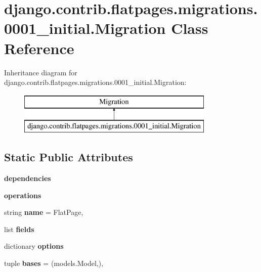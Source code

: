 \hypertarget{classdjango_1_1contrib_1_1flatpages_1_1migrations_1_10001__initial_1_1_migration}{}\section{django.\+contrib.\+flatpages.\+migrations.0001\+\_\+initial.Migration Class Reference}
\label{classdjango_1_1contrib_1_1flatpages_1_1migrations_1_10001__initial_1_1_migration}
Inheritance diagram for django.\+contrib.\+flatpages.\+migrations.0001\+\_\+initial.Migration\+:\begin{figure}[H]
\begin{center}
\leavevmode
\includegraphics[height=2.000000cm]{classdjango_1_1contrib_1_1flatpages_1_1migrations_1_10001__initial_1_1_migration}
\end{center}
\end{figure}
\subsection*{Static Public Attributes}
\begin{DoxyCompactItemize}
\item 
\mbox{\label{classdjango_1_1contrib_1_1flatpages_1_1migrations_1_10001__initial_1_1_migration_aefd2787afda3aef95aba0bf9f108cc40}} 
{\bfseries dependencies}
\item 
\mbox{\label{classdjango_1_1contrib_1_1flatpages_1_1migrations_1_10001__initial_1_1_migration_a026d8fc271aaca41a32626bf34debff9}} 
{\bfseries operations}
\item 
\mbox{\label{classdjango_1_1contrib_1_1flatpages_1_1migrations_1_10001__initial_1_1_migration_a3927685bc2502d7b41d73e1f18b7f3ba}} 
string {\bfseries name} = \textquotesingle{}Flat\+Page\textquotesingle{},
\item 
list {\bfseries fields}
\item 
dictionary {\bfseries options}
\item 
\mbox{\label{classdjango_1_1contrib_1_1flatpages_1_1migrations_1_10001__initial_1_1_migration_a0879adea70f8e803f0efa6d7c23bc8fa}} 
tuple {\bfseries bases} = (models.\+Model,),
\end{DoxyCompactItemize}


